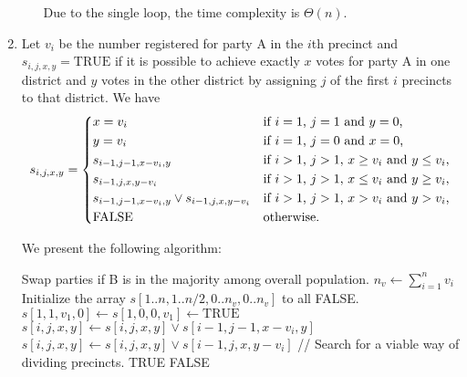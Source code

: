 \documentclass{article}
\begin{document}
\begin{enumerate}
\begin{enumerate}
        Due to the single loop, the time complexity is $\Theta(n)$.
    \end{enumerate}

    \item Let $v_i$ be the number registered for party A in the $i$th precinct and $s_{i, j, x, y} = \mathrm{TRUE}$ if it is possible to achieve exactly $x$ votes for party A in one district and $y$ votes in the other district by assigning $j$ of the first $i$ precincts to that district. We have
    \[
        s_{i, j, x, y} = \begin{dcases*}
            x = v_i & if $i = 1$, $j = 1$ and $y = 0$,\\
            y = v_i & if $i = 1$, $j = 0$ and $x = 0$,\\
            s_{i - 1, j - 1, x - v_i, y} & if $i > 1$, $j > 1$, $x \ge v_i$ and $y \le v_i$,\\
            s_{i - 1, j, x, y - v_i} & if $i > 1$, $j > 1$, $x \le v_i$ and $y \ge v_i$,\\
            s_{i - 1, j - 1, x - v_i, y} \lor s_{i - 1, j, x, y - v_i} & if $i > 1$, $j > 1$, $x > v_i$ and $y > v_i$,\\
            \mathrm{FALSE} & otherwise.
        \end{dcases*}
    \]

    We present the following algorithm:
    \begin{algorithmic}[1]
        \State Swap parties if B is in the majority among overall population.
        \State $n_v \gets \sum_{i = 1}^n v_i$
        \State Initialize the array $s[1..n, 1..n/2, 0..n_v, 0..n_v]$ to all FALSE.
        \State $s[1, 1, v_1, 0] \gets s[1, 0, 0, v_1] \gets \mathrm{TRUE}$
                            \State $s[i, j, x, y] \gets s[i, j, x, y] \lor s[i - 1, j - 1, x - v_i, y]$
                        \EndIf
                            \State $s[i, j, x, y] \gets s[i, j, x, y] \lor s[i - 1, j, x, y - v_i]$
                        \EndIf
                    \EndFor
                \EndFor
            \EndFor
        \EndFor
        \State // Search for a viable way of dividing precincts.
                    \State \Return TRUE
                \EndIf
            \EndFor
        \EndFor
        \State \Return FALSE
    \end{algorithmic}


\end{enumerate}
\end{document}
